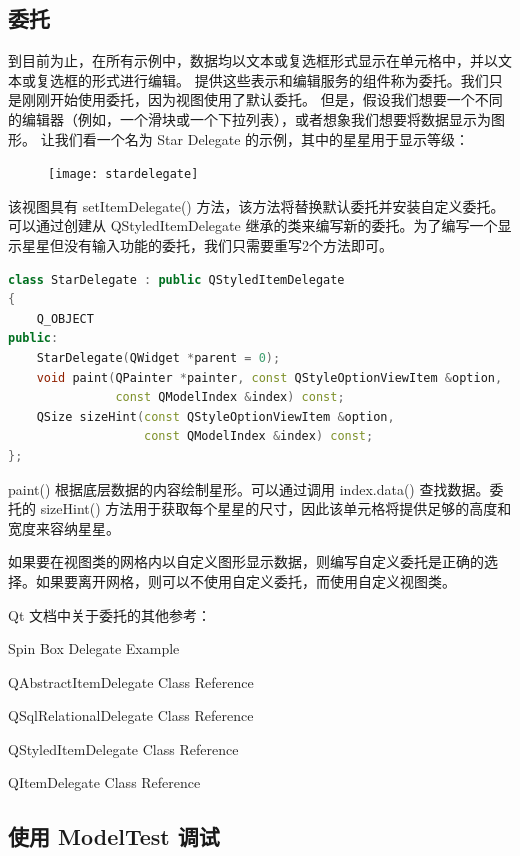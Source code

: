 \subsection{委托}

到目前为止，在所有示例中，数据均以文本或复选框形式显示在单元格中，并以文本或复选框的形式进行编辑。
提供这些表示和编辑服务的组件称为委托。我们只是刚刚开始使用委托，因为视图使用了默认委托。
但是，假设我们想要一个不同的编辑器（例如，一个滑块或一个下拉列表），或者想象我们想要将数据显示为图形。
让我们看一个名为 Star Delegate 的示例，其中的星星用于显示等级：


\begin{figure}[hbt!]  
\texttt{[image: stardelegate]}
\end{figure}

该视图具有 setItemDelegate() 方法，该方法将替换默认委托并安装自定义委托。
可以通过创建从 QStyledItemDelegate 继承的类来编写新的委托。为了编写一个显示星星但没有输入功能的委托，我们只需要重写2个方法即可。


\begin{lstlisting}[language=C++]
class StarDelegate : public QStyledItemDelegate
{
    Q_OBJECT
public:
    StarDelegate(QWidget *parent = 0);
    void paint(QPainter *painter, const QStyleOptionViewItem &option,
               const QModelIndex &index) const;
    QSize sizeHint(const QStyleOptionViewItem &option,
                   const QModelIndex &index) const;
};
\end{lstlisting}

paint() 根据底层数据的内容绘制星形。可以通过调用 index.data() 查找数据。委托的 sizeHint() 方法用于获取每个星星的尺寸，因此该单元格将提供足够的高度和宽度来容纳星星。

如果要在视图类的网格内以自定义图形显示数据，则编写自定义委托是正确的选择。如果要离开网格，则可以不使用自定义委托，而使用自定义视图类。

Qt 文档中关于委托的其他参考：

\begin{compactitem}[\arr]
\item Spin Box Delegate Example
\item QAbstractItemDelegate Class Reference
\item QSqlRelationalDelegate Class Reference
\item QStyledItemDelegate Class Reference
\item QItemDelegate Class Reference
\end{compactitem}

\subsection{使用 ModelTest 调试}

